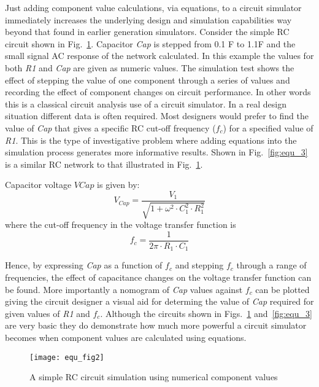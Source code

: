 
Just adding component value calculations, via equations, to a circuit
simulator immediately increases the underlying design and simulation
capabilities way beyond that found in earlier generation
simulators. Consider the simple RC circuit shown in
Fig.~\ref{fig:equ_2}. Capacitor \textit{Cap} is stepped from 0.1\micro
F to 1.1\micro F and the small signal AC response of the network
calculated. In this example the values for both \textit{R1} and
\textit{Cap} are given as numeric values. The simulation test shows
the effect of stepping the value of one component through a series of
values and recording the effect of component changes on circuit
performance. In other words this is a classical circuit analysis use
of a circuit simulator. In a real design situation different data is
often required. Most designers would prefer to find the value of
\textit{Cap} that gives a specific RC cut-off frequency ($f_{c}$) for
a specified value of \textit{R1}. This is the type of investigative
problem where adding equations into the simulation process generates
more informative results. Shown in Fig.~\ref{fig:equ_3} is a similar
RC network to that illustrated in Fig.~\ref{fig:equ_2}.

Capacitor voltage $VCap$ is given by:
\begin{equation}
V_{Cap}=\dfrac{V_1}{\sqrt{1+\omega^{2}\cdot C_1^{2} \cdot R_1^{2}}}
\end{equation}
where the cut-off frequency in the voltage transfer function is 
\begin{equation}
f_{c}=\dfrac{1}{2 \pi \cdot R_1 \cdot C_1}
\end{equation}

Hence, by expressing \textit{Cap} as a function of $f_{c}$ and
stepping $f_{c}$ through a range of frequencies, the effect of
capacitance changes on the voltage transfer function can be
found. More importantly a nomogram of \textit{Cap} values against
$f_{c}$ can be plotted giving the circuit designer a visual aid for
determing the value of \textit{Cap} required for given values of
\textit{R1} and $f_{c}$. Although the circuits shown in
Figs.~\ref{fig:equ_2} and~\ref{fig:equ_3} are very basic they do
demonstrate how much more powerful a circuit simulator becomes when
component values are calculated using equations.
 
\begin{figure}
  \centering
  \texttt{[image: equ\_fig2]}
  \caption{A simple RC circuit simulation using numerical component values}
  \label{fig:equ_2}
\end{figure} 

